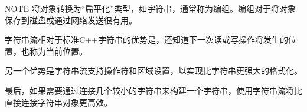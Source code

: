\begin{myNotic}{NOTE}
将对象转换为“扁平化”类型，如字符串，通常称为编组。编组对于将对象保存到磁盘或通过网络发送很有用。
\end{myNotic}

字符串流相对于标准C++字符串的优势是，还知道下一次读或写操作将发生的位置，也称为当前位置。

另一个优势是字符串流支持操作符和区域设置，以实现比字符串更强大的格式化。

最后，如果需要通过连接几个较小的字符串来构建一个字符串，使用字符串流将比直接连接字符串对象更高效。
